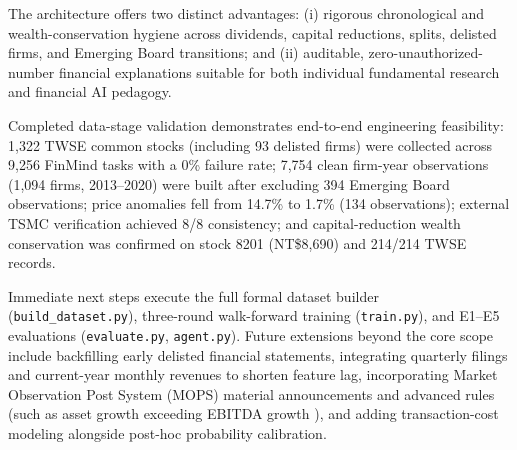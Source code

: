 \documentclass[conference]{IEEEtran}
\begin{document}
The architecture offers two distinct advantages: (i) rigorous chronological and wealth-conservation hygiene across dividends, capital reductions, splits, delisted firms, and Emerging Board transitions; and (ii) auditable, zero-unauthorized-number financial explanations suitable for both individual fundamental research and financial AI pedagogy.

Completed data-stage validation demonstrates end-to-end engineering feasibility: 1,322 TWSE common stocks (including 93 delisted firms) were collected across 9,256 FinMind tasks with a 0\% failure rate; 7,754 clean firm-year observations (1,094 firms, 2013--2020) were built after excluding 394 Emerging Board observations; price anomalies fell from 14.7\% to 1.7\% (134 observations); external TSMC verification achieved 8/8 consistency; and capital-reduction wealth conservation was confirmed on stock 8201 (NT\$8,690) and 214/214 TWSE records.

Immediate next steps execute the full formal dataset builder (\texttt{build\_dataset.py}), three-round walk-forward training (\texttt{train.py}), and E1--E5 evaluations (\texttt{evaluate.py}, \texttt{agent.py}). Future extensions beyond the core scope include backfilling early delisted financial statements, integrating quarterly filings and current-year monthly revenues to shorten feature lag, incorporating Market Observation Post System (MOPS) material announcements and advanced rules (such as asset growth exceeding EBITDA growth \cite{yartseva2025}), and adding transaction-cost modeling alongside post-hoc probability calibration.



\end{document}
